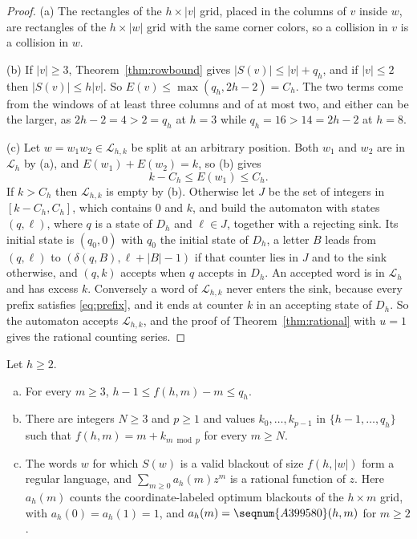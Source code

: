 \begin{proof}
(a) The rectangles of the $h\times|v|$ grid, placed in the columns of $v$ inside $w$, are rectangles of the $h\times|w|$ grid with the same corner colors, so a collision in $v$ is a collision in $w$.

(b) If $|v|\ge3$, Theorem~\ref{thm:rowbound} gives $|S(v)|\le|v|+q_h$, and if $|v|\le2$ then $|S(v)|\le h|v|$. So $E(v)\le\max(q_h,2h-2)=C_h$. The two terms come from the windows of at least three columns and of at most two, and either can be the larger, as $2h-2=4>2=q_h$ at $h=3$ while $q_h=16>14=2h-2$ at $h=8$.

(c) Let $w=w_1w_2\in\mathcal L_{h,k}$ be split at an arbitrary position. Both $w_1$ and $w_2$ are in $\mathcal L_h$ by (a), and $E(w_1)+E(w_2)=k$, so (b) gives
\begin{equation}\label{eq:prefix}
k-C_h\le E(w_1)\le C_h .
\end{equation}
If $k>C_h$ then $\mathcal L_{h,k}$ is empty by (b). Otherwise let $J$ be the set of integers in $[k-C_h,C_h]$, which contains $0$ and $k$, and build the automaton with states $(q,\ell)$, where $q$ is a state of $D_h$ and $\ell\in J$, together with a rejecting sink. Its initial state is $(q_0,0)$ with $q_0$ the initial state of $D_h$, a letter $B$ leads from $(q,\ell)$ to $(\delta(q,B),\ell+|B|-1)$ if that counter lies in $J$ and to the sink otherwise, and $(q,k)$ accepts when $q$ accepts in $D_h$. An accepted word is in $\mathcal L_h$ and has excess $k$. Conversely a word of $\mathcal L_{h,k}$ never enters the sink, because every prefix satisfies \eqref{eq:prefix}, and it ends at counter $k$ in an accepting state of $D_h$. So the automaton accepts $\mathcal L_{h,k}$, and the proof of Theorem~\ref{thm:rational} with $u=1$ gives the rational counting series.
\end{proof}

\begin{theorem}\label{thm:periodic}
Let $h\ge2$.
\begin{enumerate}[(a)]
\item For every $m\ge3$, $h-1\le f(h,m)-m\le q_h$.
\item There are integers $N\ge3$ and $p\ge1$ and values $k_0,\dots,k_{p-1}$ in $\{h-1,\dots,q_h\}$ such that $f(h,m)=m+k_{m\bmod p}$ for every $m\ge N$.
\item The words $w$ for which $S(w)$ is a valid blackout of size $f(h,|w|)$ form a regular language, and $\sum_{m\ge0}a_h(m)z^m$ is a rational function of $z$. Here $a_h(m)$ counts the coordinate-labeled optimum blackouts of the $h\times m$ grid, with $a_h(0)=a_h(1)=1$, and $a_h(m)=\seqnum{A399580}(h,m)$ for $m\ge2$.
\end{enumerate}
\end{theorem}

